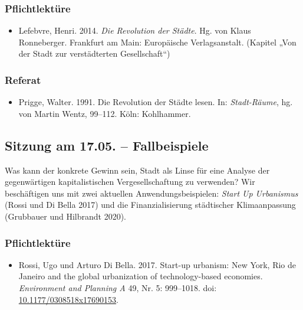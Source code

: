 \documentclass[
  ngerman,
]{article}
\providecommand{\tightlist}{%
  \setlength{\itemsep}{0pt}\setlength{\parskip}{0pt}}
\begin{document}
\hypertarget{pflichtlektuxfcre-2}{%
\subsubsection*{Pflichtlektüre}\label{pflichtlektuxfcre-2}}

\begin{itemize}
\tightlist
\item
  Lefebvre, Henri. 2014. \emph{Die Revolution der Städte}. Hg. von Klaus Ronneberger. Frankfurt am Main: Europäische Verlagsanstalt. (Kapitel „Von der Stadt zur verstädterten Gesellschaft``)
\end{itemize}

\hypertarget{referat-2}{%
\subsubsection*{Referat}\label{referat-2}}

\begin{itemize}
\tightlist
\item
  Prigge, Walter. 1991. Die Revolution der Städte lesen. In: \emph{Stadt-Räume}, hg. von Martin Wentz, 99--112. Köln: Kohlhammer.
\end{itemize}

\hypertarget{sitzung-am-17.05.-fallbeispiele}{%
\subsection{Sitzung am 17.05. -- Fallbeispiele}\label{sitzung-am-17.05.-fallbeispiele}}

Was kann der konkrete Gewinn sein, Stadt als Linse für eine Analyse der gegenwärtigen kapitalistischen Vergesellschaftung zu verwenden? Wir beschäftigen uns mit zwei aktuellen Anwendungsbeispielen: \emph{Start Up Urbanismus} (Rossi und Di Bella 2017) und die Finanzialisierung städtischer Klimaanpassung (Grubbauer und Hilbrandt 2020).

\hypertarget{pflichtlektuxfcre-3}{%
\subsubsection*{Pflichtlektüre}\label{pflichtlektuxfcre-3}}

\begin{itemize}
\tightlist
\item
  Rossi, Ugo und Arturo Di Bella. 2017. Start-up urbanism: New York, Rio de Janeiro and the global urbanization of technology-based economies. \emph{Environment and Planning A} 49, Nr. 5: 999--1018. doi: \href{https://doi.org/10.1177/0308518x17690153}{10.1177/0308518x17690153}.
\end{itemize}
\end{document}
